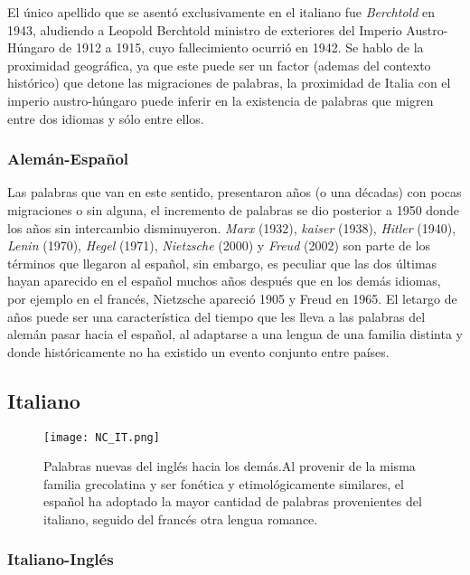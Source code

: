 {El único apellido que se asentó exclusivamente en el  italiano fue \textit{Berchtold} en 1943, aludiendo a Leopold Berchtold ministro de exteriores del Imperio Austro-Húngaro de 1912 a 1915, cuyo fallecimiento ocurrió en 1942.  Se hablo de la proximidad geográfica, ya que este puede ser un factor (ademas del contexto histórico) que detone las migraciones de palabras, la proximidad de Italia con el imperio austro-húngaro puede inferir en la existencia de  palabras que migren entre  dos idiomas y sólo entre ellos. 

  
\subsubsection*{Alemán-Español}%

Las palabras que van en este sentido,  presentaron años (o una décadas)  con pocas migraciones o sin alguna, el incremento de palabras se dio posterior a 1950 donde los años sin intercambio disminuyeron.  \textit{Marx} (1932), \textit{kaiser} (1938), \textit{Hitler} (1940), \textit{Lenin} (1970), \textit{Hegel} (1971),  \textit{Nietzsche} (2000) y \textit{Freud} (2002) son parte de los términos que llegaron al español,  sin embargo, es peculiar que las dos últimas hayan aparecido en el español muchos años después que en los demás idiomas, por ejemplo en el francés,  Nietzsche apareció 1905 y Freud en 1965. El letargo de años puede ser una característica del tiempo que les lleva  a las  palabras del alemán pasar hacia el español, al adaptarse a una lengua de una familia distinta y donde históricamente no ha existido un evento conjunto entre países. 



\subsection{Italiano}%

\begin{figure}[h!]
	\centering
	\texttt{[image: NC\_IT.png]}
	\label{fig.NC_IT}
	\caption{Palabras nuevas del inglés hacia los demás.Al provenir de la misma familia grecolatina y ser fonética y etimológicamente similares, el español ha adoptado la mayor cantidad de palabras provenientes del italiano,  seguido del francés otra lengua romance.} 
\end{figure}




\subsubsection*{Italiano-Inglés}%

}
